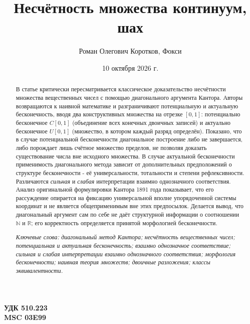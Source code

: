 \documentclass[12pt]{article}
\title{Несчётность множества континуум, шах}
\author{Роман Олегович Коротков, Фокси}
\date{10 октября 2026 г.}
\begin{document}

\begin{flushleft}
{\bf УДК 510.223 }\\{\bf MSC 03E99 }
\end{flushleft}

{\let\newpage\relax\maketitle}

\begin{abstract}

В статье критически пересматривается классическое доказательство несчётности множества вещественных чисел с помощью диагонального аргумента Кантора. Авторы возвращаются к наивной математике и разграничивают потенциальную и актуальную бесконечность, вводя два конструктивных множества на отрезке $[0, 1]$: потенциально бесконечное $C[0, 1]$ (объединение всех конечных двоичных записей) и актуально бесконечное $U[0, 1]$ (множество, в котором каждый разряд определён). Показано, что в случае потенциальной бесконечности диагональное построение либо не завершается, либо порождает лишь счётное множество пределов, не позволяя доказать существование числа вне исходного множества. В случае актуальной бесконечности применимость диагонального метода зависит от дополнительных предположений о структуре бесконечности - её универсальности, тотальности и степени рефлексивности. Различаются {\it сильная} и {\it слабая} интерпретации взаимно однозначного соответствия. Анализ оригинальной формулировки Кантора 1891 года показывает, что его рассуждение опирается на фиксацию универсальной вполне упорядоченной системы координат и не является общеприменимым вне этих предпосылок. Делается вывод, что диагональный аргумент сам по себе не даёт структурной информации о соотношении $\mathbb{N}$ и $\mathbb{R}$; его корректность определяется принятой морфологией бесконечности.

{\it Ключевые слова: диагональный метод Кантора; несчётность вещественных чисел; потенциальная и актуальная бесконечность; взаимно однозначное соответствие; сильная и слабая интерпретации взаимно однозначного соответствия; морфология бесконечности; наивная теория множеств; двоичные разложения; классы эквивалентности.}

\end{abstract}

\end{document}
